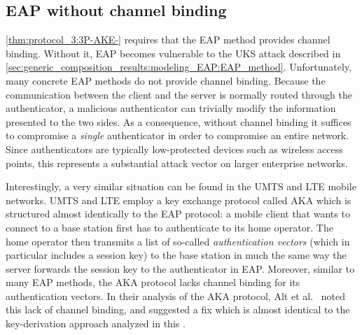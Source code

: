  



\subsection{EAP without channel binding}\label{sec:EAP:without_channel_binding}

\cref{thm:protocol_3:3P-AKE-} requires that the EAP method provides channel binding.
Without it,
EAP  becomes vulnerable to the UKS attack described in \cref{sec:generic_composition_results:modeling_EAP:EAP_method}.
Unfortunately,
many concrete EAP methods do not provide channel binding.
Because the communication between the client and the server is normally routed through the authenticator,
a malicious authenticator can trivially modify the information presented to the two sides. 
As a consequence,
without channel binding it suffices to compromise a \emph{single} authenticator in order to compromise an entire network. 
Since authenticators are typically low-protected devices such as wireless access points,
this represents  a substantial attack vector on larger enterprise networks.


Interestingly,
a very similar situation can be found in the  UMTS and LTE mobile networks.
UMTS and LTE employ a key exchange protocol called AKA which is structured almost identically to the EAP protocol:
a mobile client that wants to connect to a base station first has to authenticate to its home operator.
The home operator then transmits a list of so-called \emph{authentication vectors}
(which in particular includes a session key) to the base station in much the same way the server forwards the session key to the authenticator in EAP.  
Moreover,
similar to many EAP methods,
the AKA protocol lacks channel binding for its authentication vectors. 
In their analysis of the AKA protocol,
Alt et al.~\cite[§5]{ACNS:AFMOR16} noted this lack of channel binding,
and suggested a fix which is almost identical to the key-derivation approach analyzed in this . 


